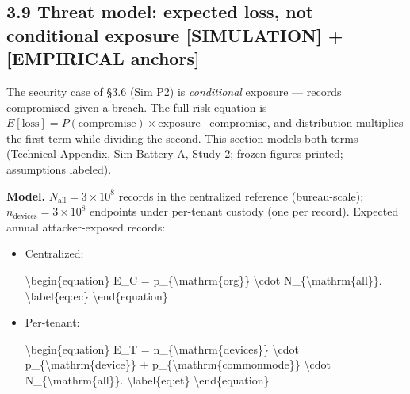 \documentclass[
]{article}
\newenvironment{Shaded}{}{}
\newcommand{\NormalTok}[1]{#1}
\begin{document}
\subsection{3.9 Threat model: expected loss, not conditional exposure
{[}SIMULATION{]} + {[}EMPIRICAL
anchors{]}}\label{threat-model-expected-loss-not-conditional-exposure-simulation-empirical-anchors}

The security case of §3.6 (Sim P2) is \emph{conditional} exposure ---
records compromised given a breach. The full risk equation is
\(E[\mathrm{loss}] = P(\mathrm{compromise}) \times \mathrm{exposure} \mid \mathrm{compromise}\),
and distribution multiplies the first term while dividing the second.
This section models both terms (Technical Appendix, Sim-Battery A, Study
2; frozen figures printed; assumptions labeled).

\textbf{Model.} \(N_{\mathrm{all}} = 3\times 10^{8}\) records in the
centralized reference (bureau-scale);
\(n_{\mathrm{devices}} = 3\times 10^{8}\) endpoints under per-tenant
custody (one per record). Expected annual attacker-exposed records:

\begin{itemize}
\item
  Centralized:

\begin{Shaded}
\begin{Highlighting}[]
\NormalTok{\textbackslash{}begin\{equation\}}
\NormalTok{ E\_C = p\_\{\textbackslash{}mathrm\{org\}\} \textbackslash{}cdot N\_\{\textbackslash{}mathrm\{all\}\}. \textbackslash{}label\{eq:ec\}}
\NormalTok{\textbackslash{}end\{equation\}}
\end{Highlighting}
\end{Shaded}
\item
  Per-tenant:

\begin{Shaded}
\begin{Highlighting}[]
\NormalTok{\textbackslash{}begin\{equation\}}
\NormalTok{ E\_T = n\_\{\textbackslash{}mathrm\{devices\}\} \textbackslash{}cdot p\_\{\textbackslash{}mathrm\{device\}\} + p\_\{\textbackslash{}mathrm\{commonmode\}\} \textbackslash{}cdot N\_\{\textbackslash{}mathrm\{all\}\}. \textbackslash{}label\{eq:et\}}
\NormalTok{\textbackslash{}end\{equation\}}
\end{Highlighting}
\end{Shaded}
\end{itemize}
\end{document}
